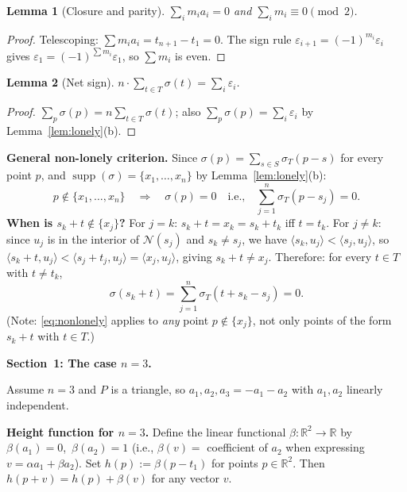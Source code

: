 \documentclass{article}
\newtheorem{lemma}{Lemma}
\begin{document}
\begin{lemma}[Closure and parity]\label{lem:closure}
$\sum_{i}m_i a_i=0$ and $\sum_i m_i\equiv 0\pmod{2}$.
\end{lemma}
\begin{proof}
Telescoping: $\sum m_i a_i=t_{n+1}-t_1=0$.
The sign rule $\varepsilon_{i+1}=(-1)^{m_i}\varepsilon_i$ gives $\varepsilon_1=(-1)^{\sum m_i}\varepsilon_1$,
so $\sum m_i$ is even.
\end{proof}

\begin{lemma}[Net sign]\label{lem:netsign}
$n\cdot\sum_{t\in T}\sigma(t)=\sum_i\varepsilon_i$.
\end{lemma}
\begin{proof}
$\sum_p\sigma(p)=n\sum_{t\in T}\sigma(t)$; also $\sum_p\sigma(p)=\sum_i\varepsilon_i$
by Lemma~\ref{lem:lonely}(b).
\end{proof}

\noindent\textbf{General non-lonely criterion.}
Since $\sigma(p)=\sum_{s\in S}\sigma_T(p-s)$ for every point $p$, and
$\operatorname{supp}(\sigma)=\{x_1,\dots,x_n\}$ by Lemma~\ref{lem:lonely}(b):
\begin{equation}\label{eq:nonlonely}
  p\notin\{x_1,\dots,x_n\}
  \quad\Longrightarrow\quad
  \sigma(p)=0
  \quad\text{i.e.,}\quad
  \sum_{j=1}^n\sigma_T(p-s_j)=0.
\end{equation}
\textbf{When is $s_k+t\notin\{x_j\}$?}
For $j=k$: $s_k+t=x_k=s_k+t_k$ iff $t=t_k$.
For $j\ne k$: since $u_j$ is in the interior of $\mathcal{N}(s_j)$ and $s_k\ne s_j$,
we have $\langle s_k,u_j\rangle<\langle s_j,u_j\rangle$, so
$\langle s_k+t,u_j\rangle<\langle s_j+t_j,u_j\rangle=\langle x_j,u_j\rangle$,
giving $s_k+t\ne x_j$.
Therefore: for every $t\in T$ with $t\ne t_k$,
\begin{equation}\label{eq:sigma0}
  \sigma(s_k+t)=\sum_{j=1}^n\sigma_T(t+s_k-s_j)=0.
\end{equation}
(Note: \eqref{eq:nonlonely} applies to \emph{any} point $p\notin\{x_j\}$, not only
points of the form $s_k+t$ with $t\in T$.)

\bigskip
\noindent\textbf{Section~1: The case $n=3$.}

Assume $n=3$ and $P$ is a triangle, so $a_1,a_2,a_3=-a_1-a_2$ with $a_1,a_2$ linearly
independent.

\medskip
\noindent\textbf{Height function for $n=3$.}
Define the linear functional $\beta:\mathbb{R}^2\to\mathbb{R}$ by
$\beta(a_1)=0$,\ $\beta(a_2)=1$
(i.e., $\beta(v)=$ coefficient of $a_2$ when expressing $v=\alpha a_1+\beta a_2$).
Set $h(p):=\beta(p-t_1)$ for points $p\in\mathbb{R}^2$.
Then $h(p+v)=h(p)+\beta(v)$ for any vector $v$.
\end{document}
